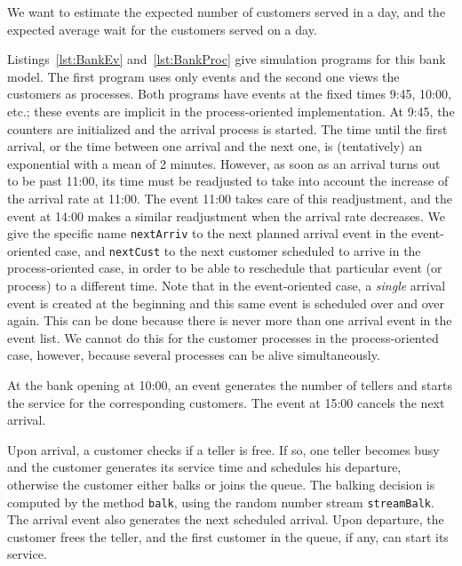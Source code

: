 We want to estimate the expected number of customers served in a
day, and the expected average wait for the customers
served on a day.

Listings~\ref{lst:BankEv} and~\ref{lst:BankProc} give simulation
programs for this bank model.
The first program uses only events and the second one 
views the customers as processes.
Both programs have events at the fixed times 9:45, 10:00, etc.;
these events are implicit in the process-oriented implementation.
At 9:45, the counters are initialized and the arrival process
is started.  The time until the first arrival,
or the time between one arrival and the next one, is (tentatively)
an exponential with a mean of 2 minutes.
However, as soon as an arrival turns out to be past 11:00,
its time must be readjusted to take into account the increase of the 
arrival rate at 11:00.
The event 11:00 takes care of this readjustment,
and the event at 14:00 makes a similar readjustment
when the arrival rate decreases.
We give the specific name \texttt{nextArriv} to the next planned
arrival event in the event-oriented case, and \texttt{nextCust} to the 
next customer scheduled to arrive in the process-oriented case,
in order to be able to reschedule
that particular event (or process) to a different time.
Note that in the event-oriented case, a {\em single\/} arrival event is
created at the beginning and this same event is scheduled over and
over again.  This can be done because there is never more than one
arrival event in the event list.
We cannot do this for the customer processes in the
process-oriented case, however, because several processes can be alive
simultaneously.

At the bank opening at 10:00, an event generates the number 
of tellers and starts the service for the corresponding customers.
The event at 15:00 cancels the next arrival.

Upon arrival, a customer checks if a teller is free.
If so, one teller becomes busy and the customer generates its
service time and schedules his departure, otherwise the
customer either balks or joins the queue.
The balking decision is computed by the method \texttt{balk},
using the random number stream \texttt{streamBalk}.
The arrival event also generates the next scheduled arrival.
Upon departure, the customer frees the teller, and the first
customer in the queue, if any, can start its service.

